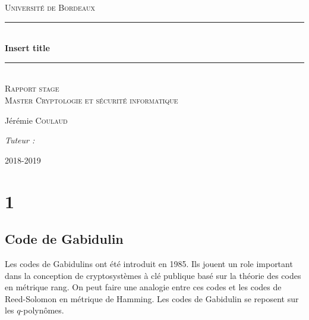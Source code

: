 \documentclass[12pt]{article}
\title{}
\author{Jérémie Coulaud}
\newcommand{\HRule}{\rule{\linewidth}{0.5mm}}
\begin{document}
\newtheorem{prop}{Proposition}
\newtheorem{defi}{Définition}
\newtheorem{thm}{Théorème}
\begin{titlepage}

\begin{center}
\textsc{\LARGE Université de Bordeaux} \\[2.0cm]

\vspace{3cm}
    \HRule \\[0.4cm]
    { \huge \bfseries Insert title\\[0.4cm] }
 \HRule \\[2cm]

 \textsc{\large Rapport stage} \\[1.5cm]
 \textsc{\large Master Cryptologie et sécurité informatique} \\[1.5cm]
 \vspace{4cm}
    \begin{minipage}{0.4\textwidth}
      \begin{flushleft} \large
        Jérémie \textsc{Coulaud}\\
      \end{flushleft}
    \end{minipage}
    \begin{minipage}{0.4\textwidth}
      \begin{flushright} \large
        \emph{Tuteur :}  \textsc{}\\
      \end{flushright}
    \end{minipage}

 \vfill
    {\large 2018-2019}
\end{center}
\end{titlepage}
\newpage
\tableofcontents
\newpage
\section{1}


\subsection{Code de Gabidulin}
Les codes de Gabidulins ont été introduit en 1985. Ils jouent un role important dans la conception de cryptosystèmes à clé publique basé sur la théorie des codes en métrique rang. On peut faire une analogie entre ces codes et les codes de Reed-Solomon en métrique de Hamming. Les codes de Gabidulin se reposent sur les $q$-polynômes.
\end{document}
